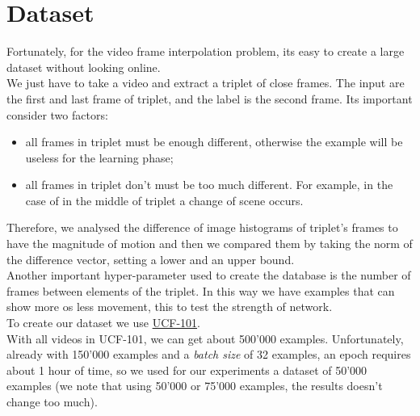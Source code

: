 \documentclass[11pt, a4paper]{article}
\begin{document}
	\section{Dataset}
	Fortunately, for the video frame interpolation problem, its easy to create a large dataset without looking online.\\
	We just have to take a video and extract a triplet of close frames. The input are the first and last frame of triplet, and the label is the second frame. Its important consider two factors:
	\begin{itemize}
		\item all frames in triplet must be enough different, otherwise the example will be useless for the learning phase;
		\item all frames in triplet don't must be too much different. For example, in the case of in the middle of triplet a change of scene occurs. 
	\end{itemize}
	Therefore, we analysed the difference of image histograms of triplet's frames to have the magnitude of motion and then we compared them by taking the norm of the difference vector, setting a lower and an upper bound.\\
	Another important hyper-parameter used to create the database is the number of frames between elements of the triplet. In this way we have examples that can show more os less movement, this to test the strength of network.\\
	To create our dataset we use \href{https://www.crcv.ucf.edu/data/UCF101.php}{UCF-101}.\\
	With all videos in UCF-101, we can get about 500'000 examples. Unfortunately, already with 150'000 examples and a \textit{batch size} of 32 examples, an epoch requires about 1 hour of time, so we used for our experiments a dataset of 50'000 examples (we note that using 50'000 or 75'000 examples, the results doesn't change too much).
	 
\end{document}
